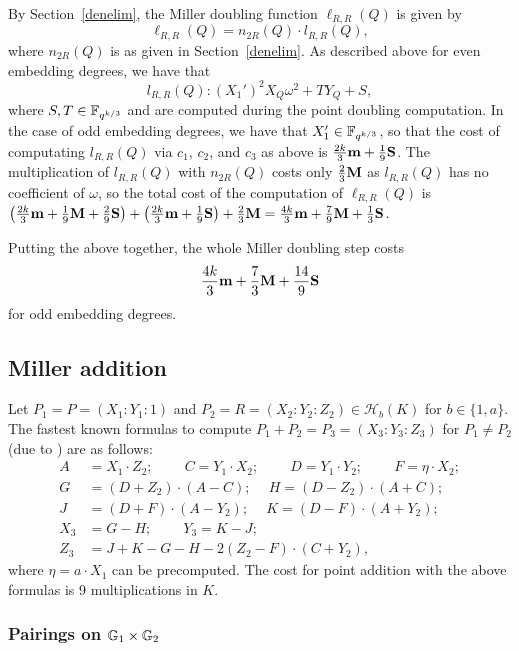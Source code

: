 By Section~\ref{denelim}, the Miller doubling function $\ell_{R,R}(Q)$ is given by
\[\ell_{R,R}(Q) = n_{2R}(Q) \cdot l_{R,R}(Q),\]
where $n_{2R}(Q)$ is as given in Section~\ref{denelim}.
As described above for even embedding degrees, we have that
\[l_{R,R}(Q): (X_1')^2X_Q\omega^2 + T Y_Q + S,\]
where $S,T \in \mathbb{F}_{q^{k/3}}$ and are computed during the point doubling computation. 
In the case of odd embedding degrees, we have that $X_1' \in \mathbb{F}_{q^{k/3}}$,
so that the cost of computating $l_{R,R}(Q)$ via $c_1$, $c_2$, and $c_3$ as above is
$\frac{2k}{3}\textbf{m} + \frac{1}{9}\textbf{S}$.
The multiplication of $l_{R,R}(Q)$ with $n_{2R}(Q)$ costs only $\frac{2}{3}\textbf{M}$ as $l_{R,R}(Q)$ has no coefficient of $\omega$, so the total cost of the computation of $\ell_{R,R}(Q)$ is 
$\left(\frac{2k}{3}\textbf{m} + \frac{1}{9}\textbf{M} + \frac{2}{9}\textbf{S}\right)
+ \left(\frac{2k}{3}\textbf{m} + \frac{1}{9}\textbf{S} \right)
+ \frac{2}{3}\textbf{M}
=
\frac{4k}{3}\textbf{m} + \frac{7}{9}\textbf{M} + \frac{1}{3}\textbf{S}$.

Putting the above together, the whole Miller doubling step costs
\[\frac{4k}{3}\textbf{m} + \frac{7}{3}\textbf{M} + \frac{14}{9}\textbf{S}\]
for odd embedding degrees.

\subsection{Miller addition}

Let $P_1 = P = (X_1:Y_1:1)$ and $P_2 = R = (X_2:Y_2:Z_2) \in \mathcal{H}_b(K)$ for $b \in \{1,a\}$.
The fastest known formulas to compute $P_1 + P_2 = P_3 = (X_3:Y_3:Z_3)$
for $P_1 \neq P_2$ (due to \cite{2012/hess}) are as follows:
\begin{align*}
A &= X_1 \cdot Z_2;\	\qquad
C = Y_1 \cdot X_2;\	\qquad
D = Y_1 \cdot Y_2;\	\qquad
F = \eta \cdot X_2;\\
G &= (D + Z_2) \cdot (A - C);\	\quad
H = (D - Z_2) \cdot (A + C);\\
J &= (D + F) \cdot (A - Y_2);\	\quad
K = (D - F) \cdot (A + Y_2);\\
X_3 &= G - H;\	\qquad
Y_3 = K - J;\\
Z_3 &= J + K - G - H - 2(Z_2 - F) \cdot (C + Y_2),
\end{align*}
where $\eta = a\cdot X_1$ can be precomputed.
The cost for point addition with the above formulas is 9 multiplications in $K$.

\subsubsection{Pairings on $\mathbb{G}_{1} \times \mathbb{G}_{2}$}


